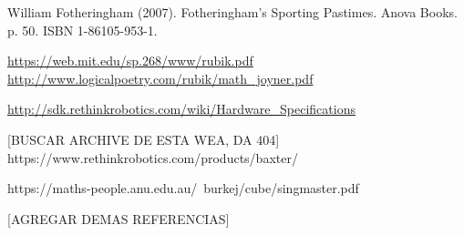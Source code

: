 \begin{thebibliography}{99}
	 William Fotheringham (2007). Fotheringham's Sporting Pastimes. Anova Books. p. 50. ISBN 1-86105-953-1.

	 \url{https://web.mit.edu/sp.268/www/rubik.pdf}
	 \url{http://www.logicalpoetry.com/rubik/math_joyner.pdf}

	 \url{http://sdk.rethinkrobotics.com/wiki/Hardware_Specifications}

	 [BUSCAR ARCHIVE DE ESTA WEA, DA 404] {https://www.rethinkrobotics.com/products/baxter/}

	 https://maths-people.anu.edu.au/~burkej/cube/singmaster.pdf

	[AGREGAR DEMAS REFERENCIAS]

\end{thebibliography}
